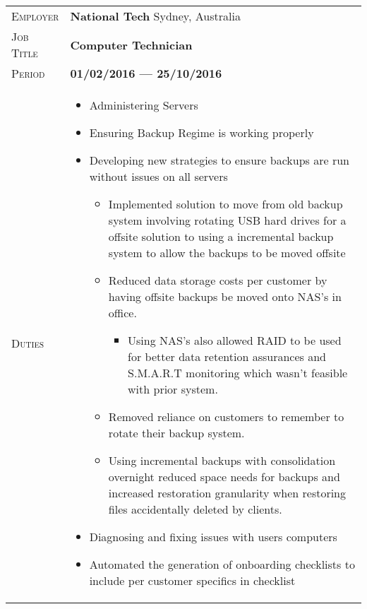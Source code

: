 \documentclass[a4paper, oneside, final]{scrartcl} %
\newcommand{\gray}{\rowcolor[gray]{.90}} %
\newcommand{\lightgrey}{\rowcolor[gray]{.95}} %
\begin{document}
\begin{center}
\ifit{}
\begin{tabularx}{0.97\linewidth}{>{\raggedleft\scshape}p{2cm}X}
  \gray{} Employer & \textbf{National Tech} \hfill Sydney, Australia\\
  \gray{} Job Title & \textbf{Computer Technician}\\
  \gray{} Period & \textbf{01/02/2016 --- 25/10/2016}\\
  \lightgrey{} Duties & \begin{itemize}
  \item{} Administering Servers
  \item{} Ensuring Backup Regime is working properly
  \item{} Developing new strategies to ensure backups are run without issues on all servers
    \begin{itemize}
    \item{} Implemented solution to move from old backup system involving rotating USB hard drives for a offsite solution to using a incremental backup system to allow the backups to be moved offsite
    \item{} Reduced data storage costs per customer by having offsite backups be moved onto NAS's in office.
      \begin{itemize}
      \item{} Using NAS's also allowed RAID to be used for better data retention assurances and S.M.A.R.T monitoring which wasn't feasible with prior system.
      \end{itemize}
    \item{} Removed reliance on customers to remember to rotate their backup system.
      \item{} Using incremental backups with consolidation overnight reduced space needs for backups and increased restoration granularity when restoring files accidentally deleted by clients.
    \end{itemize}
  \item{} Diagnosing and fixing issues with users computers
  \item{} Automated the generation of onboarding checklists to include per customer specifics in checklist
  \end{itemize}
\end{tabularx}

\vspace{2pt}
\fi


\end{center}
\end{document}
